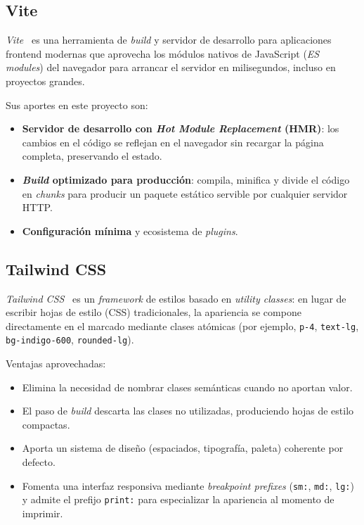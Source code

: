 \subsection{Vite}

\emph{Vite}~\cite{vite2024} es una herramienta de \emph{build} y servidor de desarrollo para aplicaciones frontend modernas que aprovecha los módulos nativos de JavaScript (\emph{ES modules}) del navegador para arrancar el servidor en milisegundos, incluso en proyectos grandes.

Sus aportes en este proyecto son:

\begin{itemize}
    \item \textbf{Servidor de desarrollo con \emph{Hot Module Replacement} (HMR)}: los cambios en el código se reflejan en el navegador sin recargar la página completa, preservando el estado.
    \item \textbf{\emph{Build} optimizado para producción}: compila, minifica y divide el código en \emph{chunks} para producir un paquete estático servible por cualquier servidor HTTP.
    \item \textbf{Configuración mínima} y ecosistema de \emph{plugins}.
\end{itemize}

\subsection{Tailwind CSS}

\emph{Tailwind CSS}~\cite{tailwind2024} es un \emph{framework} de estilos basado en \emph{utility classes}: en lugar de escribir hojas de estilo (CSS) tradicionales, la apariencia se compone directamente en el marcado mediante clases atómicas (por ejemplo, \texttt{p-4}, \texttt{text-lg}, \texttt{bg-indigo-600}, \texttt{rounded-lg}).

Ventajas aprovechadas:

\begin{itemize}
    \item Elimina la necesidad de nombrar clases semánticas cuando no aportan valor.
    \item El paso de \emph{build} descarta las clases no utilizadas, produciendo hojas de estilo compactas.
    \item Aporta un sistema de diseño (espaciados, tipografía, paleta) coherente por defecto.
    \item Fomenta una interfaz responsiva mediante \emph{breakpoint prefixes} (\texttt{sm:}, \texttt{md:}, \texttt{lg:}) y admite el prefijo \texttt{print:} para especializar la apariencia al momento de imprimir.
\end{itemize}

